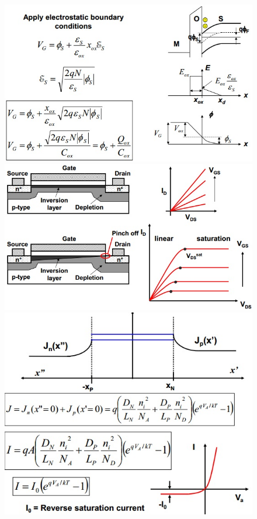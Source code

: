 \documentclass[11pt,landscape]{article}
\begin{document}
\begin{multicols}{3}
\begin{figure}[H]
\end{figure}
\begin{figure}[H]
	\includegraphics[scale=0.50]{./Images/2/MOSplots.jpg}
	\includegraphics[scale=0.45]{./Images/2/MOSFETIV.jpg}
	\includegraphics[scale=0.55]{./Images/2/DiodeEq.jpg}

\end{figure}
\end{multicols}
\end{document}
